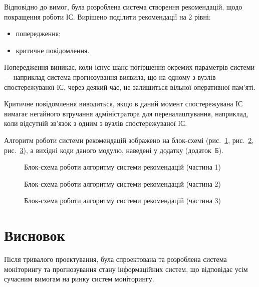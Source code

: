\documentclass{thesis_utf8}
\begin{document}
Відповідно до вимог, була розроблена система створення рекомендацій, щодо покращення роботи ІС. Вирішено поділити рекомендації на 2 рівні:
\begin{itemize}
    \item попередження;
    \item критичне повідомлення.
\end{itemize}

Попередження виникає, коли існує шанс погіршення окремих параметрів системи --- наприклад система прогнозування виявила, що на одному з вузлів спостережуваної ІС, через деякий час, не залишиться вільної оперативної пам'яті.

Критичне повідомлення виводиться, якщо в даний момент спостережувана ІС вимагає негайного втручання адміністратора для переналаштування, наприклад, коли відсутній зв'язок з одним з вузлів спостережуваної ІС.

Алгоритм роботи системи рекомендацій зображено на блок-схемі (рис.~\ref{fig:recommend1}, рис.~\ref{fig:recommend2}, рис.~\ref{fig:recommend3}), а вихідні коди даного модулю, наведені у додатку (додаток~Б).

\begin{figure}[!hb]
    \centering
    \caption{Блок-схема роботи алгоритму системи рекомендацій (частина 1)}
    \label{fig:recommend1}
\end{figure}

\begin{figure}[!h]
    \centering
    \caption{Блок-схема роботи алгоритму системи рекомендацій (частина 2)}
    \label{fig:recommend2}
\end{figure}

\begin{figure}[!h]
    \centering
    \caption{Блок-схема роботи алгоритму системи рекомендацій (частина 3)}
    \label{fig:recommend3}
\end{figure}

\section{Висновок}

Після тривалого проектування, була спроектована та розроблена система моніторингу та прогнозування стану інформаційних систем, що відповідає усім сучасним вимогам на ринку систем моніторингу.
\end{document}
